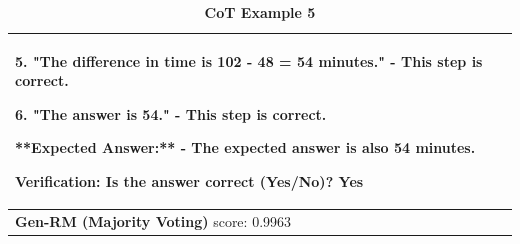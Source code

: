 \begin{table}[ht]
\begin{tabular}{ |p{16.4cm}| }
{5. "The difference in time is 102 - 48 = 54 minutes."\newline
   - This step is correct.\newline

6. "The answer is 54."\newline
   - This step is correct.\newline

**Expected Answer:**\newline
- The expected answer is also 54 minutes.\newline

{\color{blue}Verification: Is the answer correct (Yes/No)? Yes}\newline
} \\
\midrule
{\textbf{Gen-RM (Majority Voting)} score: {\color{blue}0.9963}}
\newline \\
\midrule
\end{tabular}
\caption{
\textbf{{\genV} CoT Example 5}}
\label{cot-verifier-example-4-full-text}
\end{table}




